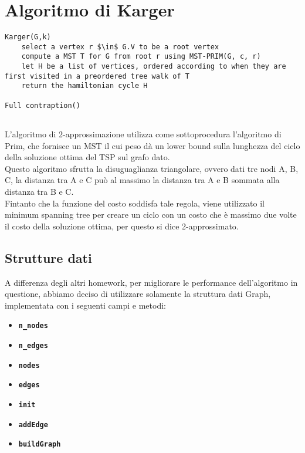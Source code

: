 \section{Algoritmo di Karger}\label{karger}

\begin{lstlisting}[mathescape=true]
Karger(G,k)
	select a vertex r $\in$ G.V to be a root vertex
	compute a MST T for G from root r using MST-PRIM(G, c, r)
	let H be a list of vertices, ordered according to when they are first visited in a preordered tree walk of T
	return the hamiltonian cycle H
	
Full contraption()
	
\end{lstlisting}	

L'algoritmo di 2-approssimazione utilizza come sottoprocedura l'algoritmo di Prim, che fornisce un MST il cui peso dà un lower bound sulla lunghezza del ciclo della soluzione ottima del TSP sul grafo dato.\\
Questo algoritmo sfrutta la disuguaglianza triangolare, ovvero dati tre nodi A, B, C, la distanza tra A e C può al massimo la distanza tra A e B sommata alla distanza tra B e C.\\
Fintanto che la funzione del costo soddisfa tale regola, viene utilizzato il minimum spanning tree per creare un ciclo con un costo che è massimo due volte il costo della soluzione ottima, per questo si dice 2-approssimato.

\subsection{Strutture dati}

	A differenza degli altri homework, per migliorare le performance dell'algoritmo in questione, abbiamo deciso di utilizzare solamente la struttura dati Graph, implementata con i seguenti campi e metodi:
	\begin{itemize}
		\item \texttt{\textbf{n\_nodes}}
		\item \texttt{\textbf{n\_edges}}
		\item \texttt{\textbf{nodes}}
		\item \texttt{\textbf{edges}}
		\item \texttt{\textbf{init}}
		\item \texttt{\textbf{addEdge}}
		\item \texttt{\textbf{buildGraph}}
	\end{itemize}
	
